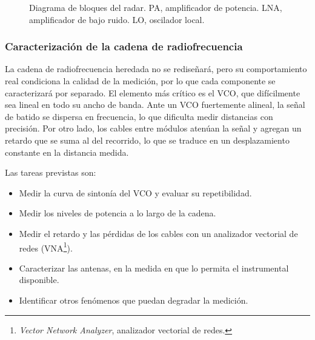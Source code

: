 \documentclass[11pt, a4paper, oneside]{article}
\newcommand{\sigla}[2]{#1\footnote{#2.}}
\begin{document}
\begin{figure}[htbp]
  \caption{Diagrama de bloques del radar. PA, amplificador de potencia.
  LNA, amplificador de bajo ruido. LO, oscilador local.}
  \label{fig:bloques}
\end{figure}

\subsubsection{Caracterización de la cadena de radiofrecuencia}

La cadena de radiofrecuencia heredada no se rediseñará, pero su
comportamiento real condiciona la calidad de la medición, por lo que
cada componente se caracterizará por separado. El elemento más crítico
es el VCO, que difícilmente sea lineal en todo su ancho de banda. Ante
un VCO fuertemente alineal, la señal de batido se dispersa en
frecuencia, lo que dificulta medir distancias con precisión. Por otro
lado, los cables entre módulos atenúan la señal y agregan un retardo
que se suma al del recorrido, lo que se traduce en un desplazamiento
constante en la distancia medida.

Las tareas previstas son:
\begin{itemize}
  \item Medir la curva de sintonía del VCO y evaluar su repetibilidad.
  \item Medir los niveles de potencia a lo largo de la cadena.
  \item Medir el retardo y las pérdidas de los cables con un
        analizador vectorial de redes (\sigla{VNA}{\textit{Vector
        Network Analyzer}, analizador vectorial de redes}).
  \item Caracterizar las antenas, en la medida en que lo permita el
        instrumental disponible.
  \item Identificar otros fenómenos que puedan degradar la medición.
\end{itemize}
\end{document}
